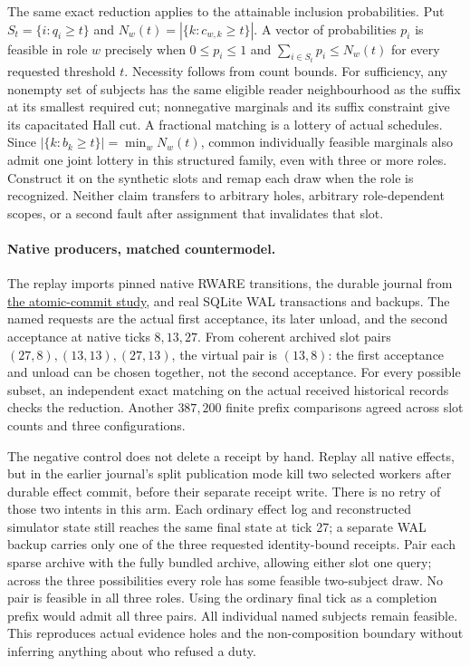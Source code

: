 \documentclass[11pt]{article}
\begin{document}
The same exact reduction applies to the attainable inclusion
probabilities. Put \(S_t=\{i:q_i\ge t\}\) and
\(N_w(t)=|\{k:c_{w,k}\ge t\}|\). A vector of probabilities \(p_i\)
is feasible in role \(w\) precisely when \(0\le p_i\le1\) and
\(\sum_{i\in S_t}p_i\le N_w(t)\) for every requested threshold \(t\).
Necessity follows from count bounds. For sufficiency, any nonempty
set of subjects has the same eligible reader neighbourhood as the
suffix at its smallest required cut; nonnegative marginals and its
suffix constraint give its capacitated Hall cut. A fractional
matching is a lottery of actual schedules. Since
\(|\{k:b_k\ge t\}|=\min_w N_w(t)\), common individually feasible
marginals also admit one joint lottery in this structured family,
even with three or more roles. Construct it on the synthetic slots
and remap each draw when the role is recognized. Neither claim
transfers to arbitrary holes, arbitrary role-dependent scopes,
or a second fault after assignment that invalidates that slot.

\paragraph{Native producers, matched countermodel.}
The replay imports pinned native RWARE transitions, the durable journal
from \href{https://github.com/eternal-november/eos-research-programmes/pull/633}
{the atomic-commit study}, and real SQLite WAL transactions and backups.
The named requests are the actual first acceptance, its later unload,
and the second acceptance at native ticks \(8,13,27\).
From coherent archived slot pairs \((27,8),(13,13),(27,13)\),
the virtual pair is \((13,8)\): the first acceptance and unload can be
chosen together, not the second acceptance. For every possible subset,
an independent exact matching on the actual received historical
records checks the reduction. Another \(387{,}200\) finite prefix
comparisons agreed across slot counts and three configurations.

The negative control does not delete a receipt by hand. Replay all
native effects, but in the earlier journal's split publication mode
kill two selected workers after durable effect commit, before their
separate receipt write. There is no retry of those two intents in this
arm. Each ordinary effect log and reconstructed simulator state still
reaches the same final state at tick 27; a separate WAL backup carries
only one of the three requested identity-bound receipts.
Pair each sparse archive with the fully bundled archive, allowing
either slot one query; across the three possibilities every role has
some feasible two-subject draw. No pair is feasible in all three roles.
Using the ordinary final tick as a completion prefix would admit
all three pairs. All individual named subjects remain feasible.
This reproduces actual evidence holes and the non-composition
boundary without inferring anything about who refused a duty.
\end{document}
